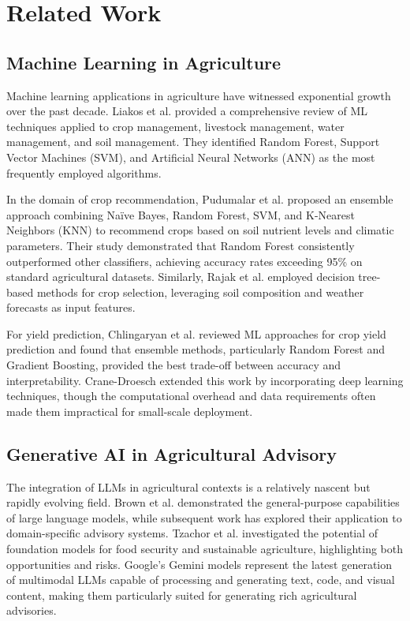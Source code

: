 
\section{Related Work}
\label{sec:related}

\subsection{Machine Learning in Agriculture}
Machine learning applications in agriculture have witnessed exponential growth over the past decade. Liakos et al. \cite{liakos2018} provided a comprehensive review of ML techniques applied to crop management, livestock management, water management, and soil management. They identified Random Forest, Support Vector Machines (SVM), and Artificial Neural Networks (ANN) as the most frequently employed algorithms.

In the domain of crop recommendation, Pudumalar et al. \cite{pudumalar2017} proposed an ensemble approach combining Na\"ive Bayes, Random Forest, SVM, and K-Nearest Neighbors (KNN) to recommend crops based on soil nutrient levels and climatic parameters. Their study demonstrated that Random Forest consistently outperformed other classifiers, achieving accuracy rates exceeding 95\% on standard agricultural datasets. Similarly, Rajak et al. \cite{rajak2017} employed decision tree-based methods for crop selection, leveraging soil composition and weather forecasts as input features.

For yield prediction, Chlingaryan et al. \cite{chlingaryan2018} reviewed ML approaches for crop yield prediction and found that ensemble methods, particularly Random Forest and Gradient Boosting, provided the best trade-off between accuracy and interpretability. Crane-Droesch \cite{crane2018} extended this work by incorporating deep learning techniques, though the computational overhead and data requirements often made them impractical for small-scale deployment.

\subsection{Generative AI in Agricultural Advisory}
The integration of LLMs in agricultural contexts is a relatively nascent but rapidly evolving field. Brown et al. \cite{brown2020} demonstrated the general-purpose capabilities of large language models, while subsequent work has explored their application to domain-specific advisory systems. Tzachor et al. \cite{tzachor2023} investigated the potential of foundation models for food security and sustainable agriculture, highlighting both opportunities and risks. Google's Gemini models \cite{google2024gemini} represent the latest generation of multimodal LLMs capable of processing and generating text, code, and visual content, making them particularly suited for generating rich agricultural advisories.

